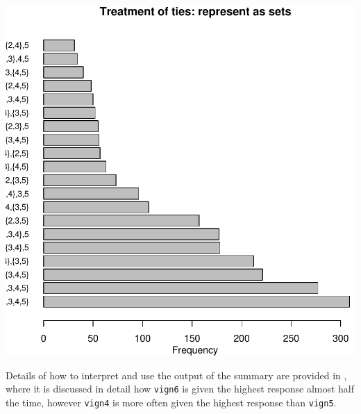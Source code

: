 \documentclass{amsart}
\newcommand{\code}[1]{{\texttt{#1}}}
\begin{document}
\includegraphics{anchors-vignette-order}

Details of how to interpret and use the output of the summary are
provided in \cite{wand.ea:2007}, where it is discussed in detail how
\code{vign6} is given the highest response almost half the
time, however \code{vign4} is more often given the highest response
than \code{vign5}.  
\end{document}
